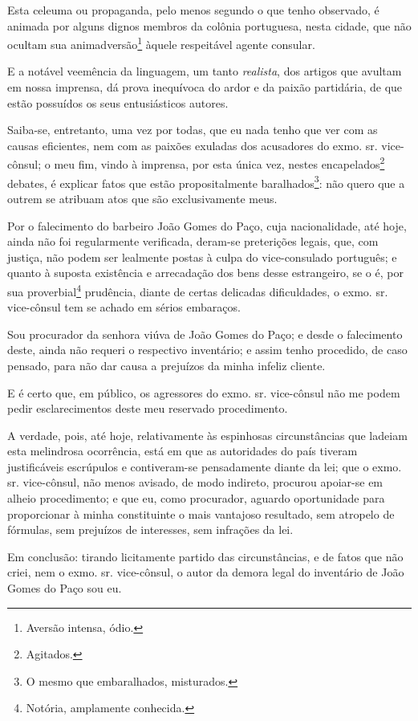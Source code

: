 Esta celeuma ou propaganda, pelo menos segundo o que tenho observado, é
animada por alguns dignos membros da colônia portuguesa, nesta cidade,
que não ocultam sua animadversão\footnote{Aversão intensa, ódio.}
àquele respeitável agente consular.

E a notável veemência da linguagem, um tanto \emph{realista}, dos
artigos que avultam em nossa imprensa, dá prova inequívoca do ardor e da
paixão partidária, de que estão possuídos os seus entusiásticos autores.

Saiba-se, entretanto, uma vez por todas, que eu nada tenho que ver com
as causas eficientes, nem com as paixões exuladas dos acusadores do
exmo. sr. vice-cônsul; o meu fim, vindo à imprensa, por esta única vez,
nestes encapelados\footnote{Agitados.} debates, é explicar fatos que
estão propositalmente baralhados\footnote{O mesmo que embaralhados,
  misturados.}: não quero que a outrem se atribuam atos que são
exclusivamente meus.

Por o falecimento do barbeiro João Gomes do Paço, cuja nacionalidade,
até hoje, ainda não foi regularmente verificada, deram-se preterições
legais, que, com justiça, não podem ser lealmente postas à culpa do
vice-consulado português; e quanto à suposta existência e arrecadação
dos bens desse estrangeiro, se o é, por sua proverbial\footnote{
  Notória, amplamente conhecida.}
prudência, diante de certas
delicadas dificuldades, o exmo. sr. vice-cônsul tem se achado em sérios
embaraços.

Sou procurador da senhora viúva de João Gomes do Paço; e desde o
falecimento deste, ainda não requeri o respectivo inventário; e assim
tenho procedido, de caso pensado, para não dar causa a prejuízos da
minha infeliz cliente.

E é certo que, em público, os agressores do exmo. sr. vice-cônsul não me
podem pedir esclarecimentos deste meu reservado procedimento.

A verdade, pois, até hoje, relativamente às espinhosas circunstâncias
que ladeiam esta melindrosa ocorrência, está em que as autoridades do
país tiveram justificáveis escrúpulos e contiveram-se pensadamente
diante da lei; que o exmo. sr. vice-cônsul, não menos avisado, de modo
indireto, procurou apoiar-se em alheio procedimento; e que eu, como
procurador, aguardo oportunidade para proporcionar à minha constituinte
o mais vantajoso resultado, sem atropelo de fórmulas, sem prejuízos de
interesses, sem infrações da lei.

Em conclusão: tirando licitamente partido das circunstâncias, e de fatos
que não criei, nem o exmo. sr. vice-cônsul, o autor da demora legal do
inventário de João Gomes do Paço sou eu.

